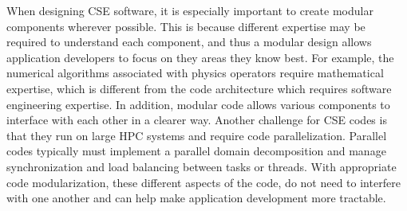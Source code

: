 
When designing CSE software, it is especially important to create
modular components wherever possible.  This is because different expertise may be required to understand
each component, and thus a modular design allows application
developers to focus on they areas they know best. For example, the
numerical algorithms associated with physics operators require mathematical expertise, which is
different from the code architecture which requires software
engineering expertise. In addition, modular code allows various components to interface with each other in a clearer way.  Another challenge for CSE codes is that they run on large HPC systems and require code parallelization.  Parallel codes typically must implement a parallel domain decomposition and manage synchronization and load balancing between tasks or threads.  With appropriate code modularization, these different aspects of the code, do not need to interfere with one another and can help make application development more tractable.


